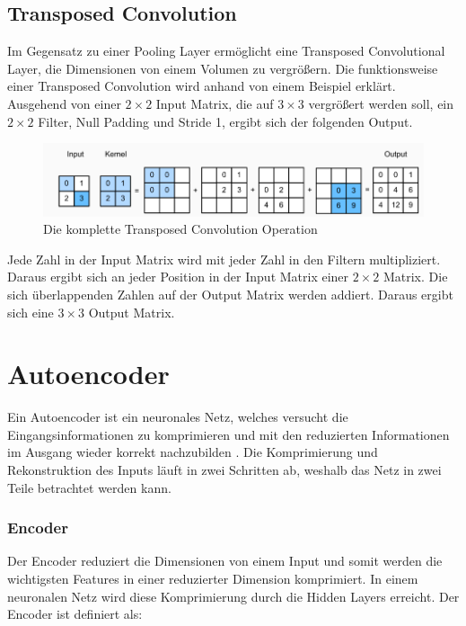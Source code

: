\subsection{Transposed Convolution}
Im Gegensatz zu einer Pooling Layer ermöglicht eine Transposed Convolutional Layer, die Dimensionen von einem Volumen zu vergrößern. 
Die funktionsweise einer Transposed Convolution wird anhand von einem Beispiel erklärt. 
\\
Ausgehend von einer $ 2 \times 2 $ Input Matrix, die auf $ 3 \times 3 $ vergrößert werden soll, ein $ 2 \times 2 $ Filter, 
Null Padding und Stride 1, ergibt sich der folgenden Output. 

\begin{figure}[H]
  \centering
  \includegraphics[width=1\textwidth]{resources/cnn/transposed-conv.png}
  \caption{
    Die komplette Transposed Convolution Operation
    \cite{zhang2020dive}
  }
  \label{image:transposed-conv}
\end{figure}

Jede Zahl in der Input Matrix wird mit jeder Zahl in den Filtern multipliziert. Daraus ergibt sich an jeder Position in der Input Matrix einer 
$ 2 \times 2 $ Matrix. Die sich überlappenden Zahlen auf der Output Matrix werden addiert. Daraus ergibt sich eine $ 3 \times 3 $ Output Matrix.

\section{Autoencoder}
Ein Autoencoder ist ein neuronales Netz, welches versucht die Eingangsinformationen zu komprimieren und mit den reduzierten Informationen 
im Ausgang wieder korrekt nachzubilden \cite{was-ist-autoencoder}. Die Komprimierung und Rekonstruktion des Inputs läuft in zwei Schritten ab, 
weshalb das Netz in zwei Teile betrachtet werden kann.
\\
\subsubsection{Encoder}
Der Encoder reduziert die Dimensionen von einem Input und somit werden die wichtigsten Features in einer reduzierter Dimension komprimiert.
In einem neuronalen Netz wird diese Komprimierung durch die Hidden Layers erreicht. Der Encoder ist definiert als:

